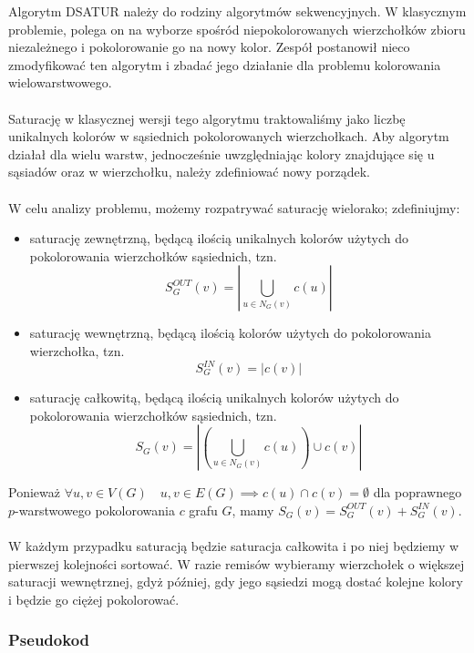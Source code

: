\documentclass[10pt,a4paper]{article}
\begin{document}
	Algorytm DSATUR należy do rodziny algorytmów sekwencyjnych. W klasycznym problemie, polega on na wyborze spośród niepokolorowanych wierzchołków zbioru niezależnego i pokolorowanie go na nowy kolor. Zespół postanowił nieco zmodyfikować ten algorytm i zbadać jego działanie dla problemu kolorowania wielowarstwowego.
	\\~\\
	Saturację w klasycznej wersji tego algorytmu traktowaliśmy jako liczbę unikalnych kolorów w sąsiednich pokolorowanych wierzchołkach. Aby algorytm działał dla wielu warstw, jednocześnie uwzględniając kolory znajdujące się u sąsiadów oraz w wierzchołku, należy zdefiniować nowy porządek. 
	\\~\\
	W celu analizy problemu, możemy rozpatrywać saturację wielorako; zdefiniujmy:
	\begin{itemize}
		\item saturację zewnętrzną, będącą ilością unikalnych kolorów użytych do pokolorowania wierzchołków sąsiednich, tzn.
		\[S^{OUT}_{G}(v) = \left|\bigcup_{u \in N_{G}(v)} c(u)\right|\]
		\item saturację wewnętrzną, będącą ilością kolorów użytych do pokolorowania wierzchołka, tzn.
		\[S^{IN}_{G}(v) = |c(v)|\]
		\item saturację całkowitą, będącą ilością unikalnych kolorów użytych do pokolorowania wierzchołków sąsiednich, tzn.
		\[S_{G}(v) = \left|\left(\bigcup_{u \in N_{G}(v)} c(u) \right) \cup c(v)\right|\]
	\end{itemize}
	Ponieważ $\forall u,v \in V(G) \quad {u, v} \in E(G) \implies c(u) \cap c(v) = \emptyset$ dla poprawnego $p$-warstwowego pokolorowania $c$ grafu $G$, mamy $S_{G}(v) = S^{OUT}_{G}(v) + S^{IN}_{G}(v)$. 
	\\~\\
	W każdym przypadku saturacją będzie saturacja całkowita i po niej będziemy w pierwszej kolejności sortować. W razie remisów wybieramy wierzchołek o większej saturacji wewnętrznej, gdyż później, gdy jego sąsiedzi mogą dostać kolejne kolory i będzie go ciężej pokolorować.

	\subsubsection{Pseudokod}
\end{document}
